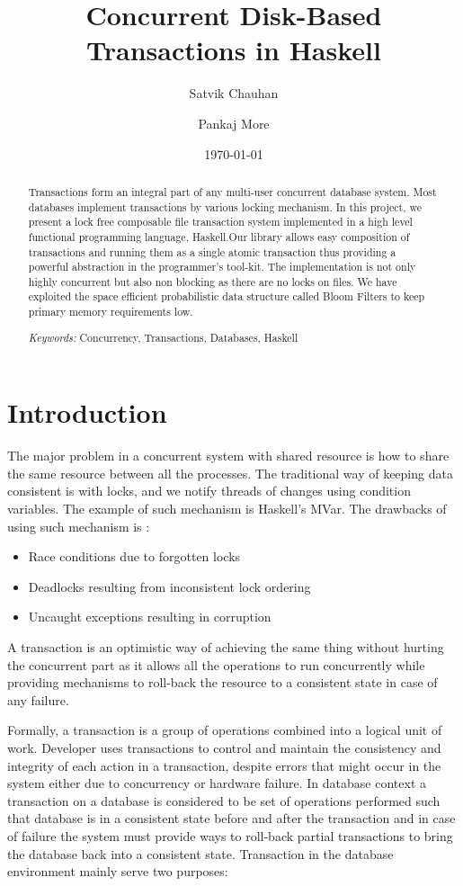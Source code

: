 \documentclass[11pt,a4paper]{article}
\title{ Concurrent Disk-Based Transactions in Haskell}
\author{Satvik Chauhan \and Pankaj More}
\date{{\small \today}}
\begin{document}
\maketitle
%
\begin{abstract}
Transactions form an integral part of any multi-user concurrent database system. Most databases implement transactions by various locking mechanism.
In this project, we present a lock free composable file transaction system implemented in a high level functional programming language, Haskell.Our library allows easy composition of transactions and running them as a single atomic transaction thus providing a powerful abstraction in the programmer's tool-kit. The implementation is not only highly concurrent but also non blocking as there are no locks on files. We have exploited the space efficient probabilistic data structure called Bloom Filters to keep primary memory requirements low.


\emph{Keywords:} Concurrency, Transactions, Databases, Haskell

\end{abstract}

%
\section{Introduction}

The major problem in a concurrent system with shared resource is how to share the same resource between all the processes. The traditional way of keeping data consistent is with locks, and we notify threads of changes using condition variables. The example of such mechanism is Haskell's MVar. The drawbacks of using such mechanism is :
\begin{itemize}
\item Race conditions due to forgotten locks
\item Deadlocks resulting from inconsistent lock ordering 
\item Uncaught exceptions resulting in corruption 
\end{itemize}

A transaction is an optimistic way of achieving the same thing without hurting the concurrent part as it allows  all the operations to run concurrently while providing mechanisms to roll-back the resource to a consistent state in case of any failure.

Formally, a transaction is a group of operations combined into a logical unit of work. Developer uses transactions to control and maintain the consistency and integrity of each action in a transaction, despite errors that might occur in the system either due to concurrency or hardware failure. In database context a transaction on a database is considered to be set of operations performed such that database is in a consistent state before and after the transaction and in case of failure the system must provide ways to roll-back partial transactions to bring the database back into a consistent state. Transaction in the database environment mainly serve two purposes:
\end{document}
